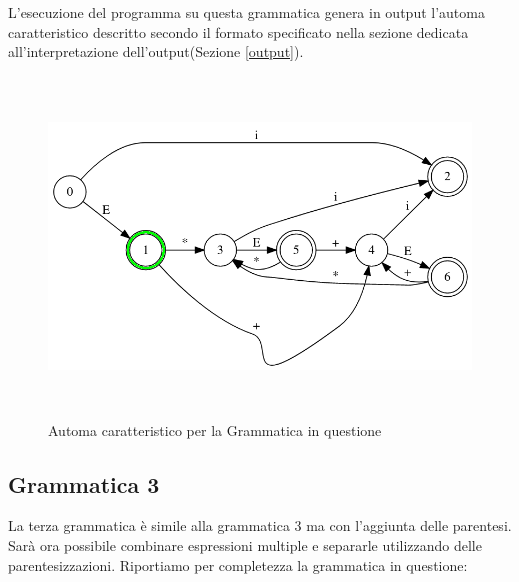 \documentclass[12pt]{article}
\begin{document}
L'esecuzione del programma su questa grammatica genera in output l'automa caratteristico descritto secondo il formato specificato nella sezione dedicata all'interpretazione dell'output(Sezione \ref{output}).

\begin{figure}[h]
  \includegraphics[height=9cm, keepaspectratio]{assets/automa2.png}
  \caption{Automa caratteristico per la Grammatica in questione}
  \label{fig:automa1}
\end{figure}


\subsection{Grammatica 3}
La terza grammatica è simile alla grammatica 3 ma con l'aggiunta delle parentesi. Sarà ora possibile combinare espressioni multiple e separarle utilizzando delle parentesizzazioni. Riportiamo per completezza la grammatica in questione:

\end{document}
